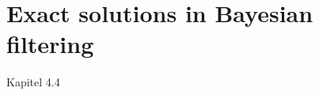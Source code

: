 

\section{Exact solutions in Bayesian filtering}\label{sec: exact solutions in bayesian filtering}




Kapitel 4.4
